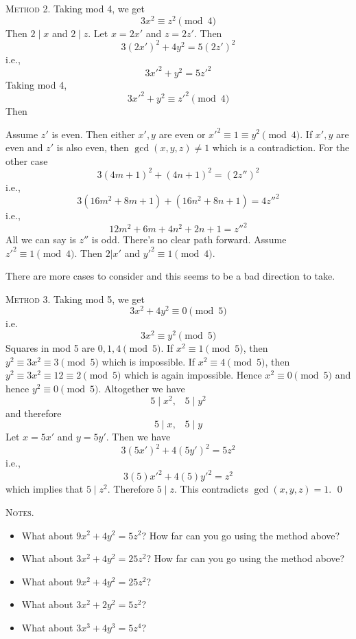 \textsc{Method 2.}
Taking mod 4, we get
\[
  3x^2 \equiv z^2 \pmod{4}
\]
Then $2 \mid x$ and $2 \mid z$.
Let $x = 2x'$ and $z = 2z'$.
Then
\[
  3(2x')^2 + 4y^2 = 5(2z')^2
\]
i.e.,
\[
  3x'^2 + y^2 = 5z'^2
\]
Taking mod 4,
\[
  3x'^2 + y^2 \equiv z'^2 \pmod{4}
\]
Then
\begin{tightlist}
  \li Assume $z'$ is even. Then either $x',y$ are even or $x'^2 \equiv 1 \equiv y^2 \pmod{4}$.
  If $x',y$ are even and $z'$ is also even, then $\gcd(x, y, z) \neq 1$ which is a contradiction.
  For the other case
  \[
    3(4m + 1)^2 + (4n + 1)^2 = (2z'')^2
  \]
  i.e.,
  \[
    3(16m^2 + 8m + 1) + (16n^2 + 8n + 1) = 4z''^2
  \]
  i.e.,
  \[
    12m^2 + 6m + 4n^2 + 2n  + 1 = z''^2
  \]
  All we can say is $z''$ is odd.
  There's no clear path forward.
  \li Assume $z'^2 \equiv 1 \pmod{4}$. Then $2 | x'$ and $y'^2 \equiv 1 \pmod{4}$.
\end{tightlist}
There are more cases to consider and this seems to be a bad direction to take.


\textsc{Method 3.}
Taking mod 5, we get
\[
  3x^2 + 4y^2 \equiv 0 \pmod{5}
\]
i.e.
\[
  3x^2 \equiv y^2 \pmod{5}
\]
Squares in mod 5 are $0,1,4 \pmod{5}$.
If $x^2 \equiv 1\pmod{5}$, then $y^2 \equiv 3x^2 \equiv 3 \pmod{5}$
which is impossible.
If $x^2 \equiv 4\pmod{5}$, then $y^2 \equiv 3x^2 \equiv 12 \equiv 2 \pmod{5}$
which is again impossible.
Hence $x^2 \equiv 0 \pmod{5}$ and hence $y^2 \equiv 0 \pmod{5}$.
Altogether we have
\[
  5 \mid x^2, \,\,\,\,\, 5 \mid y^2
\]
and therefore
\[
  5 \mid x, \,\,\,\,\, 5 \mid y
\]
Let $x = 5x'$ and $y = 5y'$. Then we have
\[
  3(5x')^2 + 4(5y')^2 = 5z^2
\]
i.e.,
\[
  3(5)x'^2 + 4(5)y'^2 = z^2
\]
which implies that $5 \mid z^2$. Therefore $5 \mid z$.
This contradicts $\gcd(x, y, z) = 1$.
\qed

\textsc{Notes.}
\begin{itemize}
  \item What about $9x^2 + 4y^2 = 5z^2$? How far can you go using the method above?
  \item What about $3x^2 + 4y^2 = 25z^2$? How far can you go using the method above?
  \item What about $9x^2 + 4y^2 = 25z^2$?
  \item What about $3x^2 + 2y^2 = 5z^2$?
  \item What about $3x^3 + 4y^3 = 5z^4$?
\end{itemize}

